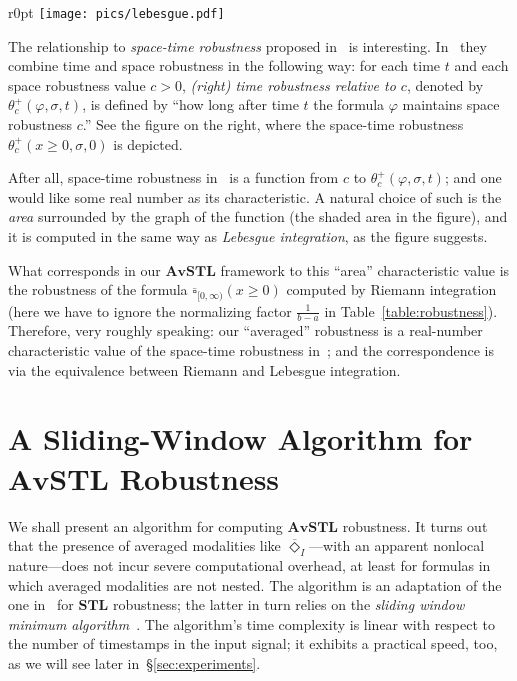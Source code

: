 \documentclass[envcountsect,orivec]{llncs} \usepackage{etex} \usepackage[]{graphicx}
\newcommand{\STL}{\textbf{STL}}
\newcommand{\TDiaOp}[1]{\overline{\Diamond}_{#1}}
\newcommand{\TBoxOp}[1]{\overline{\square}_{#1}}
\newcommand{\AvSTL}{\textbf{AvSTL}}
\begin{document}
\begin{wrapfigure}[7]{r}{0pt}
\centering
        \texttt{[image: pics/lebesgue.pdf]}
\end{wrapfigure}
The relationship to \emph{space-time robustness} proposed
in~\cite{DBLP:conf/formats/DonzeM10} is
interesting. In~\cite{DBLP:conf/formats/DonzeM10} they combine time and
space robustness in the following way: for each time $t$ and each space robustness value $c>0$,
\emph{(right) time robustness relative to $c$}, denoted by
$\theta^{+}_{c}(\varphi,\sigma,t)$, is defined by ``how long
after time $t$ the formula $\varphi$
maintains space robustness $c$.'' See the figure
on the right, where the space-time robustness
$\theta^{+}_{c}(x\ge 0,\sigma,0)$ is depicted.

After all, space-time robustness in~\cite{DBLP:conf/formats/DonzeM10} is a function from $c$ to 
$\theta^{+}_{c}(\varphi,\sigma,t)$; and one would like some real number as
its characteristic. A natural choice of such is the \emph{area}
surrounded 
by
the graph of the function (the shaded area in the figure), and it is
 computed in the same way as
\emph{Lebesgue integration}, as the figure suggests. 

What corresponds in our $\AvSTL$
framework to this ``area'' characteristic value  is the robustness of the formula
$\TBoxOp{[0,\infty)}(x\ge 0)$ computed by Riemann
integration (here we have to
ignore the normalizing factor $\frac{1}{b-a}$ in
Table~\ref{table:robustness}). Therefore,  very roughly speaking:
our ``averaged'' robustness is a real-number characteristic value of  the
space-time robustness
in~\cite{DBLP:conf/formats/DonzeM10}; and the
correspondence
is via the equivalence between Riemann and Lebesgue integration.





\section{A Sliding-Window Algorithm for $\AvSTL$ Robustness}
\label{sec:algorithm}




We shall present an algorithm for computing $\AvSTL$ robustness. It
turns out that the presence of averaged modalities like
$\TDiaOp{I}$---with an apparent nonlocal nature---does not incur
severe computational overhead, at least for formulas
in which averaged modalities are not nested.
The algorithm is an adaptation of the one
in~\cite{DBLP:conf/cav/DonzeFM13} for $\STL$ robustness; the latter in turn relies on the 
\emph{sliding window minimum
algorithm}~\cite{DBLP:journals/njc/Lemire06}.
The algorithm's time complexity is linear with respect to the number of
timestamps in the input signal; it exhibits a practical speed, too, as
we will see later in~\S{}\ref{sec:experiments}.
\end{document}

